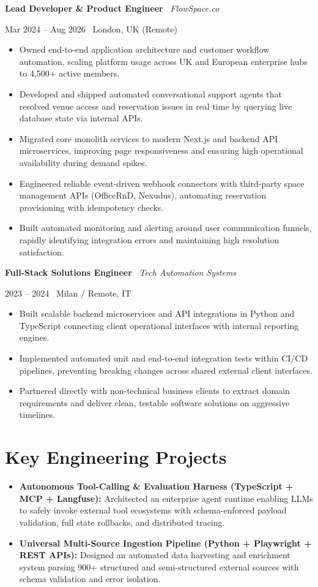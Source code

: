 \documentclass[a4paper,10pt]{article}
\newcommand{\role}[4]{%
  \vspace{2pt}\noindent
  \begin{minipage}[t]{0.70\textwidth}\raggedright\textbf{#1} \textbullet\ \textit{#3}\end{minipage}%
  \hfill
  \begin{minipage}[t]{0.28\textwidth}\raggedleft\footnotesize\color{gray}#2 \textbullet\ #4\end{minipage}%
  \vspace{1pt}%
}
\begin{document}
\vspace{3pt}
\role{Lead Developer \& Product Engineer}{Mar 2024 -- Aug 2026}{FlowSpace.co}{London, UK (Remote)}
\begin{itemize}
  \item Owned end-to-end application architecture and customer workflow automation, scaling platform usage across UK and European enterprise hubs to 4,500+ active members.
  \item Developed and shipped automated conversational support agents that resolved venue access and reservation issues in real time by querying live database state via internal APIs.
  \item Migrated core monolith services to modern Next.js and backend API microservices, improving page responsiveness and ensuring high operational availability during demand spikes.
  \item Engineered reliable event-driven webhook connectors with third-party space management APIs (OfficeRnD, Nexudus), automating reservation provisioning with idempotency checks.
  \item Built automated monitoring and alerting around user communication funnels, rapidly identifying integration errors and maintaining high resolution satisfaction.
\end{itemize}

\vspace{3pt}
\role{Full-Stack Solutions Engineer}{2023 -- 2024}{Tech Automation Systems}{Milan / Remote, IT}
\begin{itemize}
  \item Built scalable backend microservices and API integrations in Python and TypeScript connecting client operational interfaces with internal reporting engines.
  \item Implemented automated unit and end-to-end integration tests within CI/CD pipelines, preventing breaking changes across shared external client interfaces.
  \item Partnered directly with non-technical business clients to extract domain requirements and deliver clean, testable software solutions on aggressive timelines.
\end{itemize}

\section{Key Engineering Projects}
\begin{itemize}
  \item \textbf{Autonomous Tool-Calling \& Evaluation Harness (TypeScript + MCP + Langfuse):} Architected an enterprise agent runtime enabling LLMs to safely invoke external tool ecosystems with schema-enforced payload validation, full state rollbacks, and distributed tracing.
  \item \textbf{Universal Multi-Source Ingestion Pipeline (Python + Playwright + REST APIs):} Designed an automated data harvesting and enrichment system parsing 900+ structured and semi-structured external sources with schema validation and error isolation.
\end{itemize}
\end{document}
